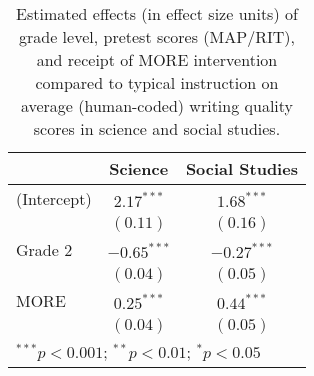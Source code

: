 
\begin{table}
\caption{Estimated effects (in effect size units) of grade level, pretest scores (MAP/RIT),
               and receipt of MORE intervention compared to typical instruction on average (human-coded)
               writing quality scores in science and social studies.}
\begin{center}
\begin{tabular}{l c c}
\hline
 & Science & Social Studies \\
\hline
(Intercept) & $2.17^{***}$  & $1.68^{***}$  \\
            & $(0.11)$      & $(0.16)$      \\
Grade 2     & $-0.65^{***}$ & $-0.27^{***}$ \\
            & $(0.04)$      & $(0.05)$      \\
MORE        & $0.25^{***}$  & $0.44^{***}$  \\
            & $(0.04)$      & $(0.05)$      \\
\hline
\multicolumn{3}{l}{\scriptsize{$^{***}p<0.001$; $^{**}p<0.01$; $^{*}p<0.05$}}
\end{tabular}
\label{tab:impact_est}
\end{center}
\end{table}
